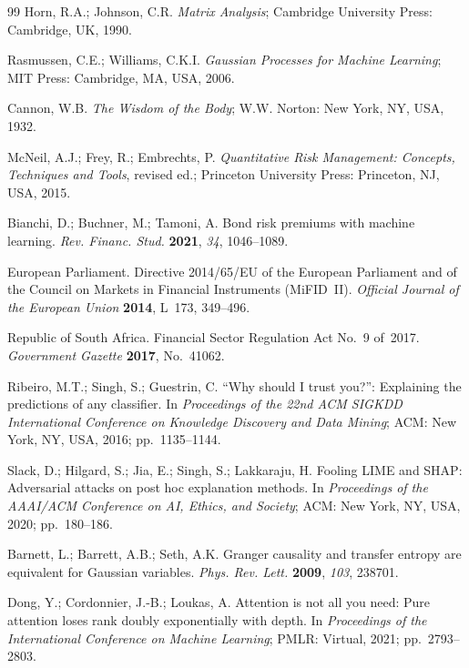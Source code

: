 \documentclass[11pt,a4paper]{article}  %
\theoremstyle{plain}
\theoremstyle{definition}
\theoremstyle{remark}
\begin{document}
\begin{thebibliography}{99}
Horn, R.A.; Johnson, C.R. \textit{Matrix Analysis};
Cambridge University Press: Cambridge, UK, 1990.

Rasmussen, C.E.; Williams, C.K.I. \textit{Gaussian Processes for
Machine Learning}; MIT Press: Cambridge, MA, USA, 2006.

Cannon, W.B. \textit{The Wisdom of the Body};
W.W. Norton: New York, NY, USA, 1932.

McNeil, A.J.; Frey, R.; Embrechts, P. \textit{Quantitative Risk
Management: Concepts, Techniques and Tools}, revised ed.;
Princeton University Press: Princeton, NJ, USA, 2015.

Bianchi, D.; Buchner, M.; Tamoni, A. Bond risk premiums with machine
learning. \textit{Rev. Financ. Stud.} \textbf{2021}, \textit{34},
1046--1089.

European Parliament. Directive 2014/65/EU of the European Parliament
and of the Council on Markets in Financial Instruments (MiFID~II).
\textit{Official Journal of the European Union} \textbf{2014},
L~173, 349--496.

Republic of South Africa. Financial Sector Regulation Act No.~9 of~2017.
\textit{Government Gazette} \textbf{2017}, No.~41062.

Ribeiro, M.T.; Singh, S.; Guestrin, C. ``Why should I trust you?'':
Explaining the predictions of any classifier. In \textit{Proceedings
of the 22nd ACM SIGKDD International Conference on Knowledge
Discovery and Data Mining}; ACM: New York, NY, USA, 2016;
pp.~1135--1144.

Slack, D.; Hilgard, S.; Jia, E.; Singh, S.; Lakkaraju, H.
Fooling LIME and SHAP: Adversarial attacks on post hoc explanation
methods. In \textit{Proceedings of the AAAI/ACM Conference on AI,
Ethics, and Society}; ACM: New York, NY, USA, 2020; pp.~180--186.

Barnett, L.; Barrett, A.B.; Seth, A.K. Granger causality and transfer
entropy are equivalent for Gaussian variables.
\textit{Phys. Rev. Lett.} \textbf{2009}, \textit{103}, 238701.

Dong, Y.; Cordonnier, J.-B.; Loukas, A. Attention is not all you need:
Pure attention loses rank doubly exponentially with depth.
In \textit{Proceedings of the International Conference on Machine
Learning}; PMLR: Virtual, 2021; pp.~2793--2803.


\end{thebibliography}
\end{document}
